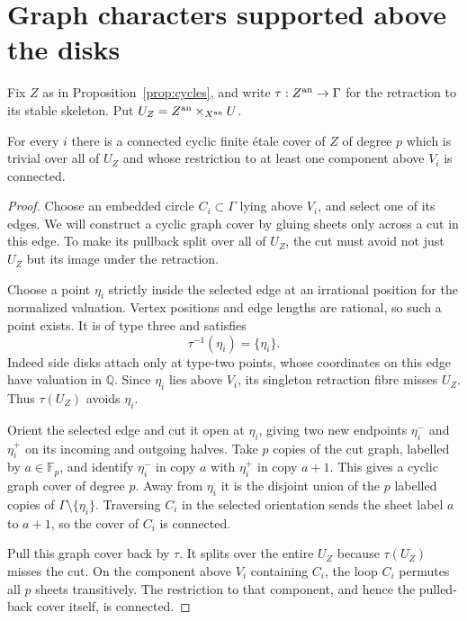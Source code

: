 \section{Graph characters supported above the disks}

Fix $Z$ as in Proposition~\ref{prop:cycles}, and write
$\tau:Z^{\rm an}\to\Gamma$ for the retraction to its stable skeleton.
Put $U_Z=Z^{\rm an}\times_{X^{\rm an}}U$.

\begin{lemma}\label{lem:graph-character}
For every $i$ there is a connected cyclic finite \'etale cover of $Z$
of degree $p$ which is trivial over all of $U_Z$ and whose restriction
to at least one component above $V_i$ is connected.
\end{lemma}
\begin{proof}
Choose an embedded circle $C_i\subset\Gamma$ lying above $V_i$,
and select one of its edges. We will construct a cyclic graph cover
by gluing sheets only across a cut in this edge. To make its pullback
split over all of $U_Z$, the cut must avoid not just $U_Z$ but its
image under the retraction.

Choose a point $\eta_i$ strictly inside the selected edge at an
irrational position for the normalized valuation. Vertex positions
and edge lengths are rational, so such a point exists. It is of
type three and satisfies
\[
                     \tau^{-1}(\eta_i)=\{\eta_i\}.
\]
Indeed side disks attach only at type-two points, whose coordinates
on this edge have valuation in $\mathbb Q$. Since $\eta_i$ lies
above $V_i$, its singleton retraction fibre misses $U_Z$. Thus
$\tau(U_Z)$ avoids $\eta_i$.

Orient the selected edge and cut it open at $\eta_i$, giving two
new endpoints $\eta_i^-$ and $\eta_i^+$ on its incoming and outgoing
halves. Take $p$ copies of the cut graph, labelled by
$a\in\mathbb F_p$, and identify $\eta_i^-$ in copy $a$ with
$\eta_i^+$ in copy $a+1$. This gives a cyclic graph cover of degree
$p$. Away from $\eta_i$ it is the disjoint union of the $p$ labelled
copies of $\Gamma\setminus\{\eta_i\}$. Traversing $C_i$ in the
selected orientation sends the sheet label $a$ to $a+1$, so the
cover of $C_i$ is connected.

Pull this graph cover back by $\tau$. It splits over the entire
$U_Z$ because $\tau(U_Z)$ misses the cut. On the component above
$V_i$ containing $C_i$, the loop $C_i$ permutes all $p$ sheets
transitively. The restriction to that component, and hence the
pulled-back cover itself, is connected.


\end{proof}

